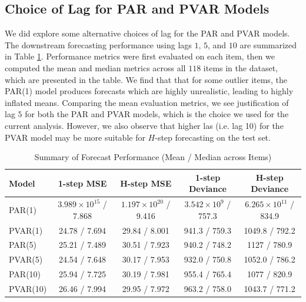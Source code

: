 \documentclass{article}
\begin{document}
\subsection{Choice of Lag for PAR and PVAR Models}

\noindent We did explore some alternative choices of lag for the PAR and PVAR models. The downstream forecasting performance using lags $1$, $5$, and $10$ are summarized in Table \ref{tab:forecast-summary}. Performance metrics were first evaluated on each item, then we computed the mean and median metrics across all $118$ items in the dataset, which are presented in the table. We find that that for some outlier items, the PAR(1) model produces forecasts which are highly unrealistic, leading to highly inflated means. Comparing the mean evaluation metrics, we see justification of lag $5$ for both the PAR and PVAR models, which is the choice we used for the current analysis. However, we also observe that higher las (i.e. lag 10) for the PVAR model may be more suitable for $H$-step forecasting on the test set.


\begin{table}[ht]
\centering
\caption{Summary of Forecast Performance (Mean / Median across Items)}
\begin{tabular}{lcccc}
\toprule
Model & 1-step MSE & H-step MSE & 1-step Deviance & H-step Deviance \\
\midrule
PAR(1) & $3.989 \times 10^{15}$ / 7.868 & $1.197 \times 10^{20}$ / 9.416 & $3.542 \times 10^{9}$ / 757.3 & $6.265 \times 10^{11}$ / 834.9 \\
PVAR(1) & 24.78 / 7.694 & 29.84 / 8.001 & 941.3 / 759.3 & 1049.8 / 792.2 \\
PAR(5) & 25.21 / 7.489 & 30.51 / 7.923 & 940.2 / 748.2 & 1127 / 780.9 \\
PVAR(5) & 24.54 / 7.648 & 30.17 / 7.953 & 932.0 / 750.8 & 1052.0 / 786.2 \\
PAR(10) & 25.94 / 7.725 & 30.19 / 7.981 & 955.4 / 765.4 & 1077 / 820.9 \\
PVAR(10) & 26.46 / 7.994 & 29.95 / 7.972 & 963.2 / 758.0 & 1043.7 / 771.2 \\
\bottomrule
\end{tabular}
\label{tab:forecast-summary}
\end{table}
\end{document}
